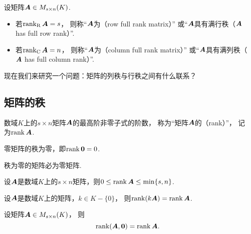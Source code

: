\begin{definition}
设矩阵\(\boldsymbol{A} \in M_{s \times n}(K)\).
\begin{itemize}
	\item 若\(\rank_{\mathrm{R}}\boldsymbol{A} = s\)，
	则称“\(\boldsymbol{A}\)为（row full rank matrix）”
	或“\(\boldsymbol{A}\)具有满行秩（\(\boldsymbol{A}\) has full row rank）”.
	\item 若\(\rank_{\mathrm{C}}\boldsymbol{A} = n\)，
	则称“\(\boldsymbol{A}\)为（column full rank matrix）”
	或“\(\boldsymbol{A}\)具有满列秩（\(\boldsymbol{A}\) has full column rank）”.
\end{itemize}
\end{definition}

现在我们来研究一个问题：矩阵的列秩与行秩之间有什么联系？

\subsection{矩阵的秩}
\begin{definition}\label{definition:线性方程组.矩阵的秩的定义}
数域\(K\)上的\(s \times n\)矩阵\(\boldsymbol{A}\)的最高阶非零子式的阶数，
称为“矩阵\(\boldsymbol{A}\)的（rank）”，
记为\(\rank\boldsymbol{A}\).
\end{definition}

\begin{proposition}\label{theorem:向量空间.零矩阵的秩为零}
零矩阵的秩为零，即\(\rank\boldsymbol0 = 0\).
\end{proposition}
\begin{proposition}\label{theorem:向量空间.秩为零的矩阵必为零矩阵}
秩为零的矩阵必为零矩阵.
\end{proposition}

\begin{property}\label{theorem:线性方程组.矩阵的秩的性质2}
设\(\boldsymbol{A}\)是数域\(K\)上的\(s \times n\)矩阵，则\(0 \leq \rank\boldsymbol{A} \leq \min\{s,n\}\).
\end{property}

\begin{property}\label{theorem:线性方程组.矩阵的秩的性质3}
设\(\boldsymbol{A}\)是数域\(K\)上的矩阵，\(k \in K-\{0\}\)，
则\(\rank(k\boldsymbol{A}) = \rank\boldsymbol{A}\).
\end{property}

\begin{property}
设矩阵\(\boldsymbol{A} \in M_{s \times n}(K)\)，
则\begin{equation*}
	\rank(\boldsymbol{A},\boldsymbol0) = \rank\boldsymbol{A}.
\end{equation*}
\end{property}

